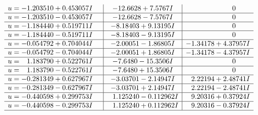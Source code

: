\documentclass[1p]{elsarticle_modified}
\theoremstyle{definition}
\begin{document}
$$\begin{array}{c|c|c}
\begin{aligned}
u &= -1.203510 + 0.453057 I\end{aligned}
 & -12.6628 + 7.5767 I & \phantom{-0.000000 } 0 \\ \hline\begin{aligned}
u &= -1.203510 - 0.453057 I\end{aligned}
 & -12.6628 - 7.5767 I & \phantom{-0.000000 } 0 \\ \hline\begin{aligned}
u &= -1.184440 + 0.519711 I\end{aligned}
 & -8.18403 + 9.13195 I & \phantom{-0.000000 } 0 \\ \hline\begin{aligned}
u &= -1.184440 - 0.519711 I\end{aligned}
 & -8.18403 - 9.13195 I & \phantom{-0.000000 } 0 \\ \hline\begin{aligned}
u &= -0.054792 + 0.704044 I\end{aligned}
 & -2.00051 - 1.86805 I & -1.34178 + 4.37957 I \\ \hline\begin{aligned}
u &= -0.054792 - 0.704044 I\end{aligned}
 & -2.00051 + 1.86805 I & -1.34178 - 4.37957 I \\ \hline\begin{aligned}
u &= \phantom{-}1.183790 + 0.522761 I\end{aligned}
 & -7.6480 - 15.3506 I & \phantom{-0.000000 } 0 \\ \hline\begin{aligned}
u &= \phantom{-}1.183790 - 0.522761 I\end{aligned}
 & -7.6480 + 15.3506 I & \phantom{-0.000000 } 0 \\ \hline\begin{aligned}
u &= -0.281349 + 0.627967 I\end{aligned}
 & -3.03701 - 2.14947 I & \phantom{-}2.22194 + 2.48741 I \\ \hline\begin{aligned}
u &= -0.281349 - 0.627967 I\end{aligned}
 & -3.03701 + 2.14947 I & \phantom{-}2.22194 - 2.48741 I \\ \hline\begin{aligned}
u &= -0.440598 + 0.299753 I\end{aligned}
 & \phantom{-}1.125240 - 0.112962 I & \phantom{-}9.20316 + 0.37924 I \\ \hline\begin{aligned}
u &= -0.440598 - 0.299753 I\end{aligned}
 & \phantom{-}1.125240 + 0.112962 I & \phantom{-}9.20316 - 0.37924 I\\
 \hline 
 \end{array}$$\newpage
\end{document}
